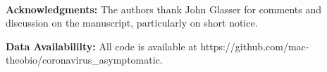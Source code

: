 \mbox{}\\
\noindent
\textbf{Acknowledgments:} The authors thank John Glasser for comments
and discussion on the manuscript, particularly on short notice. 

\noindent
\textbf{Data Availabililty:} All code is available at https://github.com/mac-theobio/coronavirus\_asymptomatic.
